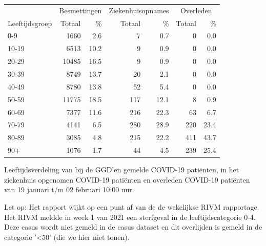 \documentclass[
  english,
  man,floatsintext]{apa6}
\begin{document}
\begin{table}[H]
\centering\begingroup\fontsize{11}{13}\selectfont

\begin{threeparttable}
\begin{tabular}{lrrrrrr}
\toprule
\multicolumn{1}{c}{ } & \multicolumn{2}{c}{Besmettingen} & \multicolumn{2}{c}{Ziekenhuisopnames} & \multicolumn{2}{c}{Overleden} \\
\cmidrule(l{3pt}r{3pt}){2-3} \cmidrule(l{3pt}r{3pt}){4-5} \cmidrule(l{3pt}r{3pt}){6-7}
Leeftijdsgroep & Totaal & \% & Totaal & \% & Totaal & \%\\
\midrule
0-9 & 1660 & 2.6 & 7 & 0.7 & 0 & 0.0\\
10-19 & 6513 & 10.2 & 9 & 0.9 & 0 & 0.0\\
20-29 & 10485 & 16.5 & 9 & 0.9 & 0 & 0.0\\
30-39 & 8749 & 13.7 & 20 & 2.1 & 0 & 0.0\\
40-49 & 8780 & 13.8 & 52 & 5.4 & 0 & 0.0\\
50-59 & 11775 & 18.5 & 117 & 12.1 & 8 & 0.9\\
60-69 & 7377 & 11.6 & 216 & 22.3 & 63 & 6.7\\
70-79 & 4141 & 6.5 & 280 & 28.9 & 220 & 23.4\\
80-89 & 3085 & 4.8 & 215 & 22.2 & 411 & 43.7\\
90+ & 1076 & 1.7 & 44 & 4.5 & 239 & 25.4\\
\bottomrule
\end{tabular}
\begin{tablenotes}
\item[1] Leeftijdsverdeling van bij de GGD’en gemelde COVID-19 patiënten, in het ziekenhuis opgenomen COVID-19 patiënten en overleden COVID-19 patiënten van 19 januari t/m 02 februari 10:00 uur.
\item[2] Let op: Het rapport wijkt op een punt af van de de wekelijkse RIVM rapportage. Het RIVM meldde in week 1 van 2021 een sterfgeval in de leeftijdscategorie 0-4. Deze casus wordt niet gemeld in de casus dataset en dit overlijden is gemeld in de categorie '<50' (die we hier niet tonen).
\end{tablenotes}
\end{threeparttable}
\endgroup{}
\end{table}

\newpage
\end{document}
